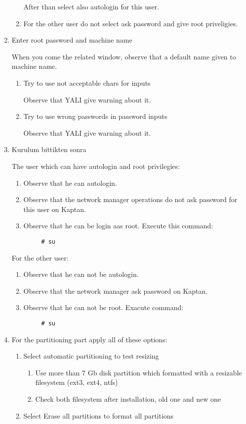 \documentclass[a4paper,10pt]{article}
\begin{document}
\begin{enumerate}
\begin{enumerate}
        After than select also autologin for this user.

        \item For the other user do not select ask password and give root priveligies.

    \end{enumerate}

\item Enter root password and machine name

When you come the related window, observe  that a default name given to machine name.
    \begin{enumerate}
        \item Try to use not acceptable chars for inputs

        Observe that YALI give warning about it.
        \item Try to use wrong passwords in password inputs

        Observe that YALI give warning about it.
    \end{enumerate}

\item Kurulum bittikten sonra

	The user which can have autologin and root privilegies:
	\begin{enumerate}
	\item Observe that he can autologin.
	\item Observe that the network manager operations do not ask password for this user on Kaptan.
	\item Observe that he can be login aas root.
	Execute this command:
	\begin{verbatim}
	 # su
	\end{verbatim}
	\end{enumerate}
	For the other user:
	\begin{enumerate}
	\item Observe that he can not be autologin.
	\item Observe that the network manager ask password on Kaptan.
	\item Observe that he can not be root.
	Exacute command:
	\begin{verbatim}
	 # su
	\end{verbatim}
	\end{enumerate}

\item For the partitioning part apply all of these options:
    \begin{enumerate}
        \item Select automatic partitioning to test resizing
        \begin{enumerate}
            \item Use more than 7 Gb disk partition which formatted with a resizable filesystem (ext3, ext4, ntfs)
            \item Check both filesystem after installation, old one and new one
        \end{enumerate}
        \item Select Erase all partitions to format all partitions


\end{enumerate}
\end{enumerate}
\end{document}
